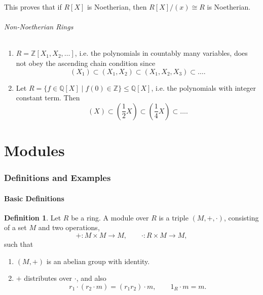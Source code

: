 \documentclass[12pt]{article}
\theoremstyle{definition}
\newtheorem{definition}{Definition}[section]
\theoremstyle{remark}
\begin{document}
This proves that if $R[X]$ is Noetherian, then $R[X]/(x) \cong R$ is Noetherian.

\paragraph{Non-Noetherian Rings}%
\label{par:non_noetherian_rings}

\begin{enumerate}[label = (\roman*)]
	\item $R = \mathbb{Z}[X_1, X_2, \ldots]$, i.e. the polynomials in countably many variables, does not obey the ascending chain condition since
		\[
			(X_1) \subset (X_1, X_2) \subset (X_1, X_2, X_3) \subset \ldots
		.\]
	\item Let $R = \{f \in \mathbb{Q}[X] \mid f(0) \in \mathbb{Z}\} \leq \mathbb{Q}[X]$, i.e. the polynomials with integer constant term. Then
		\[
			(X) \subset \left(\frac{1}{2}X\right) \subset \left(\frac{1}{4} X\right) \subset \ldots
		.\]
\end{enumerate}

\newpage

\part{Modules}%
\label{prt:modules}

\section{Definitions and Examples}%
\label{sec:definitions_and_examples_modules}

\subsection{Basic Definitions}%
\label{sub:basic_definitions_modules}

\begin{definition}
	Let $R$ be a ring. A module over $R$ is a triple $(M, +, \cdot)$, consisting of a set $M$ and two operations,
	\[
	+ : M \times M \to M, \qquad \cdot : R \times M \to M
	,\]
	such that
	\begin{enumerate}[label = (\roman*)] 
		\item $(M, +)$ is an abelian group with identity.
		\item $+$ distributes over $\cdot$, and also
			\[
				r_1 \cdot (r_2 \cdot m) = (r_1r_2) \cdot m, \qquad 1_R \cdot m = m
			.\]
	\end{enumerate}
\end{definition}
\end{document}
